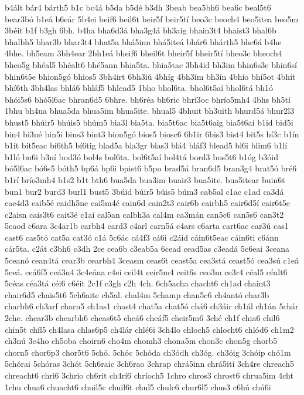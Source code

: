 {b4ált
bár4
bárth5
b1c
bc4á
b5da
b5dé
b3dh
3beab
bea5bh6
bea6c
beal5t6
bear3bó
b1eá
b6eár
5b4ei
beif6
beil6t
beir5f
beir5tí
beo3c
beoch4
beo5itea
beo5m
3béit
b1f
b3gh
6bh.
b4ha
bha6d3á
bha3g4á
bh3aig
bhain3t4
bhaist3
bhal6b
bhalbh5
bhar3b
bhar3t4
bhat5a
bhá5inn
bhá5iteá
bhár6
bhárth5
bhc6á
b4he
4bhe.
bh5eam
3bh4ear
2bh1eá
bheif6
bheil6t
bheir5f
bheir5tí
bheo3c
bheoch4
bheo5g
bhéal5
bhéalt6
bhé5ann
bhia5ta.
bhia5tac
3bh4id
bh3im
bhin6s3e
bhin6sí
bhin6t5e
bhion5gó
bhios5
3bh4irt
6bh3iú
4bhíg
4bh3ím
bh3ín
4bhío
bhí5ot
4bhít
bhí6th
3bh4las
bhlá6
bhláf5
bhlead5
1bho
bhol6ta.
bhol6t5aí
bhol6tá
bh1ó
bhói5s6
bhó5l6ac
bhran6d5
6bhre.
bh6réa
bh6ric
bhrí3oc
bhrío5mh4
4bhs
bh5tí
1bhu
bh4ua
bhua5da
bhua5im
bhua5ite.
bhual5
4bhuit
bh3uith
bhurd5á
bhur2l3
bhust5
bhúir5
bhúis5
bhúm5
bia3l
bia5ta.
bia5t6ac
bia5t6aig
bia5t6aí
b1id
bid5i
bin4
bi3né
bin5i
bins3
bint3
bion5gó
bios5
biosc6
6b1ir
6bis3
bist4
bit5s
bí3c
b1ín
b1ít
bít5eac
bí6th5
bí6tig
blad5a
bla3gr
blas3
blá4
bláf3
blead5
bl6i
blim6
b1lí
b1ló
bn6i
b3ní
bod3ó
bol4s
bol6ta.
bol6t5aí
bol4tá
bord3
bos5t6
b1óg
b3óid
bó5l6ac
bó6s5
bóth5
bp6á
bp6i
bpist6
b5po
brad5á
bran6d5
bran3g4
brat5ó
bré6
b1rí
brío3mh4
b1s2
b1t
bth6
bua5da
bua3im
buair3
bua5ite.
bua5itear
buin6t
bun1
bur2
burd3
burl1
bust5
3búid
búir5
búis5
búm3
cab5al
c1ac
c1ad
ca3dá
cae4d3
caib5é
caidh5ne
cai5m4é
cain6d
cain2t3
cair6b
cairbh5
cair6d5í
cair6t5e
c2aisn
cais3t6
cait3é
c1aí
cal5an
calbh3a
cal4m
ca3mán
can5c6
can5s6
can3t2
5caod
c6ara
3c4ar1b
carbh4
card3
c4arl
carn5á
c4ars
c6arta
cart6ac
car3ú
cas1
cast6
cas5tó
cat5a
cat3ó
c1á
5c6ác
cá4f3
cá6i
c2áid
cáin6t5eac
cáin6ti
c6ánn
cár5ta.
c2át
c3bh6
c3dh
2ce
cea6b
c3eab5a
6cead
cead5as
c3eadá
5c6eai
3ceana
5ceanó
cean4tá
cear3b
cearbh4
3ceasm
ceas6t
ceast5a
cea3stá
ceast5ó
cea3sú
c1eá
5ceá.
ceá6f5
ceá3n4
3c4eána
c4ei
ceil4t
ceir5m4
ceit6s
ceo3m
ce3r4
céal5
céalt6
5céas
céa3tá
céi6
c6éit
2c1f
c3gh
c2h
4ch.
6ch5acha
chacht6
ch1ad
chaint3
chair6d5
chais5t6
5ch6aite
ch5al.
chal4m
5champ
chan5c6
ch4antó
char3b
charbh6
ch3arf
charn5
ch1as1
chast4
chat5a
chat5ó
chá6
ch3áir
ch1ál
ch1án
5chár
2che.
chear3b
chearbh6
cheas6t5
cheá6
cheáf5
cheir5m6
3ché
ch1f
chia6
chil6
chin5t
chíl5
ch4lasa
chlas6p5
ch4lár
chlé6i
3ch4lo
chloch5
chlocht6
chlód6
ch1m2
ch3nú
3c4ho
ch5oba
choirn6
cho4m
chomh3
chona5m
chon3c
chon5g
chorb5
chorn5
chor6p3
chor5t6
5chó.
5chóc
5chóda
ch3ódh
ch3óg.
ch3óig
3chóip
chó1m
5chórai
5chóras
3chót
5ch6raic
3ch6rao
3chrap
chrá5inn
chrá5ití
3ch4re
chreach5
chreacht6
chri6
3chrio
ch6rit
ch4rí6
chríoch5
1chro
chros3
chrost6
chrua5im
4cht
1chu
chua6
chuacht6
chuil5c
chuil6t
chul5
chulc6
chur6l5
chus3
c6hú
chú6i
}
